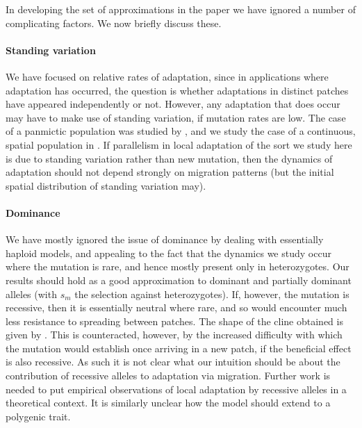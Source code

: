 \documentclass[10pt,letterpaper]{article}
\newcommand{\citet}[1]{\cite{#1}}
\begin{document}
In developing the set of approximations in the paper we have ignored a
number of complicating factors. We now briefly discuss these.

\paragraph{Standing variation} 
We have focused on relative rates of adaptation,
since in applications where adaptation has occurred,
the question is whether adaptations in distinct patches
have appeared independently or not.
However, 
any adaptation that does occur may have to make use of standing variation,
if mutation rates are low.
The case of a panmictic population was studied by \citet{softsweepsI},
and we study the case of a continuous, spatial population in \citet{ralph2014standing}.
If parallelism in local adaptation of the sort we study here is due to standing variation
rather than new mutation,
then the dynamics of adaptation should not depend strongly on migration patterns
(but the initial spatial distribution of standing variation may).

\paragraph{Dominance}
We have mostly ignored the issue of dominance 
by dealing with essentially haploid models,
and appealing to the fact that the dynamics we study occur where the mutation is rare,
and hence mostly present only in heterozygotes. 
Our results should hold as a good approximation to dominant and partially dominant alleles
(with $s_m$ the selection against heterozygotes).
If, however, the mutation is recessive, then it is essentially neutral where rare,
and so would encounter much less resistance to spreading between patches.
The shape of the cline obtained is given by \citet{haldane1948theory}.
This is counteracted, however, by the increased difficulty with which the mutation would establish
once arriving in a new patch,
if the beneficial effect is also recessive. 
As such it is not clear what our intuition should be 
about the contribution of recessive alleles to adaptation via migration. 
Further work is needed to put empirical observations of local adaptation by recessive alleles 
in a theoretical context.
It is similarly unclear how the model should extend to a polygenic trait.
\end{document}
